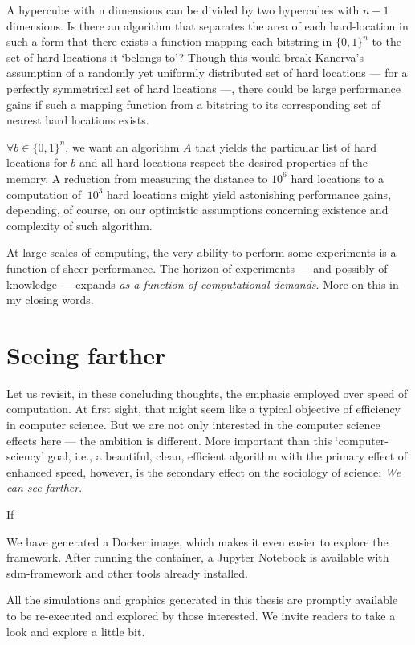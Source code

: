 A hypercube with n dimensions can be divided by two hypercubes with $n-1$ dimensions. Is there an algorithm that separates the area of each hard-location in such a form that there exists a function mapping each bitstring in $\{0,1\}^n$ to the set of hard locations it `belongs to'?  Though this would break Kanerva's assumption of a randomly yet uniformly distributed set of hard locations --- for a perfectly symmetrical set of hard locations ---, there could be large performance gains if such a mapping function from a bitstring to its corresponding set of nearest hard locations exists.

$\forall b \in \{ 0,1\} ^n$, we want an algorithm $A$ that yields the particular list of hard locations for $b$ and all hard locations respect the desired properties of the memory.  A reduction from measuring the distance to $10^6$ hard locations to a computation of $~ 10^3$ hard locations might yield astonishing performance gains, depending, of course, on our optimistic assumptions concerning existence and complexity of such algorithm.

At large scales of computing, the very ability to perform some experiments is a function of sheer performance. The horizon of experiments --- and possibly of knowledge --- expands \emph{as a function of computational demands}. More on this in my closing words.

\section{Seeing farther}

Let us revisit, in these concluding thoughts, the emphasis employed over speed of computation.  At first sight, that might seem like a typical objective of efficiency in computer science. But we are not only interested in the computer science effects here --- the ambition is different. More important than this `computer-sciency' goal, i.e., a beautiful, clean, efficient algorithm with the primary effect of enhanced speed, however, is the secondary effect on the sociology of science:  \emph{We can see farther}.

If 

We have generated a Docker image, which makes it even easier to explore the framework. After running the container, a Jupyter Notebook is available with sdm-framework and other tools already installed.


All the simulations and graphics generated in this thesis are promptly available to be re-executed and explored by those interested. We invite readers to take a look and explore a little bit.


